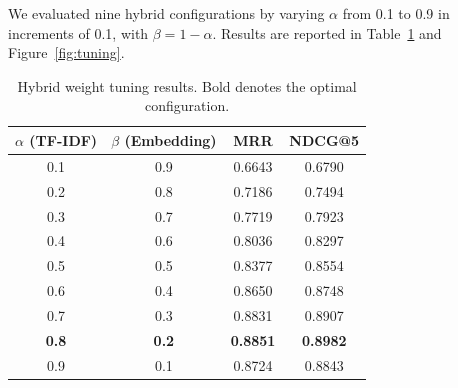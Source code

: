 \documentclass[11pt,a4paper]{article}
\begin{document}
We evaluated nine hybrid configurations by varying $\alpha$ from 0.1 to
0.9 in increments of 0.1, with $\beta = 1 - \alpha$. Results are reported
in Table~\ref{tab:tuning} and Figure~\ref{fig:tuning}.

\begin{table}[H]
\centering
\caption{Hybrid weight tuning results. Bold denotes the optimal configuration.}
\label{tab:tuning}
\begin{tabular}{cccc}
\toprule
$\alpha$ (TF-IDF) & $\beta$ (Embedding) & \textbf{MRR} & \textbf{NDCG@5} \\
\midrule
0.1 & 0.9 & 0.6643 & 0.6790 \\
0.2 & 0.8 & 0.7186 & 0.7494 \\
0.3 & 0.7 & 0.7719 & 0.7923 \\
0.4 & 0.6 & 0.8036 & 0.8297 \\
0.5 & 0.5 & 0.8377 & 0.8554 \\
0.6 & 0.4 & 0.8650 & 0.8748 \\
0.7 & 0.3 & 0.8831 & 0.8907 \\
\textbf{0.8} & \textbf{0.2} & \textbf{0.8851} & \textbf{0.8982} \\
0.9 & 0.1 & 0.8724 & 0.8843 \\
\bottomrule
\end{tabular}
\end{table}
\end{document}
